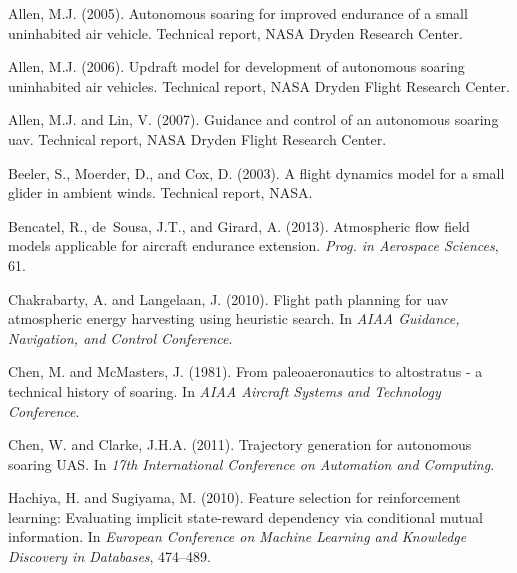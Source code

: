 \documentclass[a4paper, 10pt, conference]{ieeeconf}
\begin{document}
%

\begin{thebibliography}{99}

Allen, M.J. (2005).
\newblock Autonomous soaring for improved endurance of a small uninhabited air vehicle.
\newblock Technical report, NASA Dryden Research Center.

Allen, M.J. (2006).
\newblock Updraft model for development of autonomous soaring uninhabited air vehicles.
\newblock Technical report, NASA Dryden Flight Research Center.

Allen, M.J. and Lin, V. (2007).
\newblock Guidance and control of an autonomous soaring uav.
\newblock Technical report, NASA Dryden Flight Research Center.

Beeler, S., Moerder, D., and Cox, D. (2003).
\newblock A flight dynamics model for a small glider in ambient winds.
\newblock Technical report, NASA.

Bencatel, R., de~Sousa, J.T., and Girard, A. (2013).
\newblock Atmospheric flow field models applicable for aircraft endurance extension.
\newblock \emph{Prog. in Aerospace Sciences}, 61.

Chakrabarty, A. and Langelaan, J. (2010).
\newblock Flight path planning for uav atmospheric energy harvesting using heuristic search.
\newblock In \emph{AIAA Guidance, Navigation, and Control Conference}.

Chen, M. and McMasters, J. (1981).
\newblock From paleoaeronautics to altostratus - a technical history of soaring.
\newblock In \emph{AIAA Aircraft Systems and Technology Conference}.

Chen, W. and Clarke, J.H.A. (2011).
\newblock Trajectory generation for autonomous soaring {UAS}.
\newblock In \emph{17th International Conference on Automation and Computing}.

Hachiya, H. and Sugiyama, M. (2010).
\newblock Feature selection for reinforcement learning: Evaluating implicit state-reward dependency via conditional mutual information.
\newblock In \emph{European Conference on Machine Learning and Knowledge Discovery in Databases}, 474--489.


\end{thebibliography}
\end{document}
